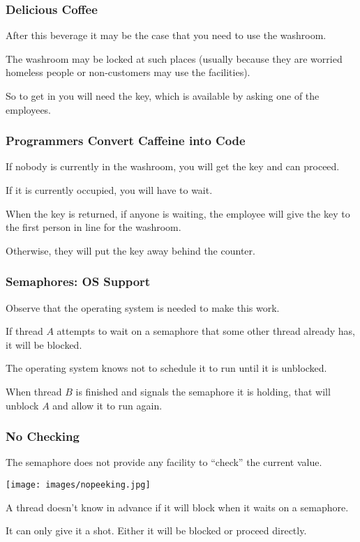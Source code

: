\begin{frame}
	\frametitle{Delicious Coffee}

	After this beverage it may be the case that you need to use the washroom.

	The washroom may be locked at such places (usually because they are worried homeless people or non-customers may use the facilities).

	So to get in you will need the key, which is available by asking one of the employees.

\end{frame}

\begin{frame}
	\frametitle{Programmers Convert Caffeine into Code}

	If nobody is currently in the washroom, you will get the key and can proceed.

	If it is currently occupied, you will have to wait.

	When the key is returned, if anyone is waiting, the employee will give the key to the first person in line for the washroom.

	Otherwise, they will put the key away behind the counter.


\end{frame}

\begin{frame}
	\frametitle{Semaphores: OS Support}

	Observe that the operating system is needed to make this work.

	If thread $A$ attempts to wait on a semaphore that some other thread already has, it will be blocked.

	The operating system knows not to schedule it to run until it is unblocked.

	When thread $B$ is finished and signals the semaphore it is holding, that will unblock $A$ and allow it to run again.
\end{frame}

\begin{frame}
	\frametitle{No Checking}

	The semaphore does not provide any facility to ``check'' the current value.

	\begin{center}
		\texttt{[image: images/nopeeking.jpg]}
	\end{center}

	A thread doesn't know in advance if it will block when it waits on a semaphore.

	It can only give it a shot.
	Either it will be blocked or proceed directly.

\end{frame}

